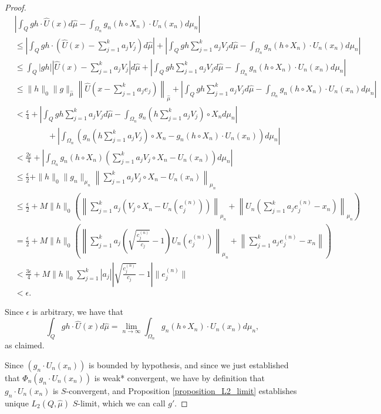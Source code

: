 \documentclass{amsart}
\theoremstyle{definition}
\theoremstyle{remark}
\def \HMU{\hat{\mu}}
\def \HU{\hat{U}}
\begin{document}
\begin{proof}
	\begin{align*}
		&\left|\int_{Q}gh\cdot\HU(x)d\HMU-\int_{\Omega_n}g_n\left(h\circ X_n\right)\cdot U_n(x_n)d\mu_n \right|\\
		&\leq\left|\int_{Q}gh\cdot\left(\HU(x)-\sum_{j=1}^ka_jV_j\right)d\HMU \right|+\left|\int_{Q}gh\sum_{j=1}^ka_jV_jd\HMU-\int_{\Omega_n}g_n\left(h\circ X_n\right)\cdot U_n(x_n)d\mu_n\right|\\
		&\leq \int_{Q} |gh|\left|\HU(x)-\sum_{j=1}^ka_jV_j \right| d\HMU+\left|\int_{Q}gh\sum_{j=1}^ka_jV_jd\HMU-\int_{\Omega_n}g_n\left(h\circ X_n\right)\cdot U_n(x_n)d\mu_n\right|\\
		&\leq \|h\|_0\|g\|_{\HMU}\left\|\HU\left(x-\sum_{j=1}^ka_je_j\right)\right\|_{\HMU}+\left|\int_{Q}gh\sum_{j=1}^ka_jV_jd\HMU-\int_{\Omega_n}g_n\left(h\circ X_n\right)\cdot U_n(x_n)d\mu_n\right|\\
		&<\frac{\epsilon}{4}+\left|\int_{Q}gh\sum_{j=1}^ka_jV_jd\HMU-\int_{\Omega_n}g_n\left(h\sum_{j=1}^ka_jV_j\right)\circ X_nd\mu_n\right|\\
		&\qquad\qquad+\left|\int_{\Omega_n}\left(g_n\left(h\sum_{j=1}^ka_jV_j\right)\circ X_n-g_n(h\circ X_n)\cdot U_n(x_n) \right)d\mu_n\right|\\
		&<\frac{2\epsilon}{4}+\left|\int_{\Omega_n}g_n(h\circ X_n)\left(\sum_{j=1}^k a_jV_j\circ X_n-U_n(x_n)\right)d\mu_n\right|\\
		&\leq\frac{\epsilon}{2}+\|h\|_0\|g_n\|_{\mu_n}\left\|\sum_{j=1}^k a_jV_j\circ X_n-U_n(x_n)\right\|_{\mu_n}\\
		&\leq\frac{\epsilon}{2}+M\|h\|_0\left(\left\|\sum_{j=1}^ka_j\left(V_j\circ X_n-U_n(e_j^{(n)})\right)\right\|_{\mu_n}+\left\|U_n\left(\sum_{j=1}^ka_je_j^{(n)}-x_n\right)\right\|_{\mu_n}\right)\\
		&=\frac{\epsilon}{2}+M\|h\|_0\left(\left\|\sum_{j=1}^ka_j\left(\sqrt{\frac{c_j^{(n)}}{c_j}}-1\right)U_n(e_j^{(n)})\right\|_{\mu_n}+\left\|\sum_{j=1}^ka_je_j^{(n)}-x_n \right\|\right)\\
		&<\frac{3\epsilon}{4}+M\|h\|_0\sum_{j=1}^k|a_j|\left|\sqrt{\frac{c_j^{(n)}}{c_j}}-1 \right|\|e_j^{(n)}\|\\
		&<\epsilon.
	\end{align*}
	
	Since $\epsilon$ is arbitrary, we have that \[\int_{Q}gh\cdot\HU(x)d\HMU=\lim_{n\rightarrow\infty}\int_{\Omega_n}g_n\left(h\circ X_n\right)\cdot U_n(x_n)d\mu_n,\] as claimed.
	
	Since $(g_n\cdot U_n(x_n))$ is bounded by hypothesis, and since we just established that $\Phi_n(g_n\cdot U_n(x_n))$ is weak* convergent, we have by definition that $g_n\cdot U_n(x_n)$ is $S$-convergent, and Proposition \ref{proposition_L2_limit} establishes unique $L_2(Q,\HMU)$ $S$-limit, which we can call $g'$. 
	

\end{proof}
\end{document}
